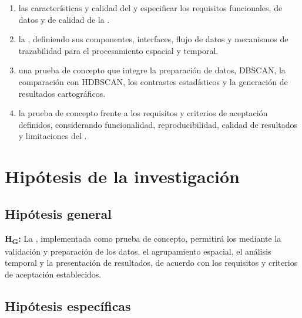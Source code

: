 \begin{enumerate}[label=OE\arabic*.]
    \item {} las características y calidad del  y especificar los requisitos funcionales, de datos y de calidad de la .
    \item {} la , definiendo sus componentes, interfaces, flujo de datos y mecanismos de trazabilidad para el procesamiento espacial y temporal.
    \item {} una prueba de concepto que integre la preparación de datos, DBSCAN, la comparación con HDBSCAN, los contrastes estadísticos y la generación de resultados cartográficos.
    \item {} la prueba de concepto frente a los requisitos y criterios de aceptación definidos, considerando funcionalidad, reproducibilidad, calidad de resultados y limitaciones del .
\end{enumerate}

\section{Hipótesis de la investigación}
\label{sec:hipotesis}

\subsection{Hipótesis general}

\textbf{H\textsubscript{G}:} La , implementada como prueba de concepto, permitirá  los  mediante la validación y preparación de los datos, el agrupamiento espacial, el análisis temporal y la presentación de resultados, de acuerdo con los requisitos y criterios de aceptación establecidos.

\subsection{Hipótesis específicas}

